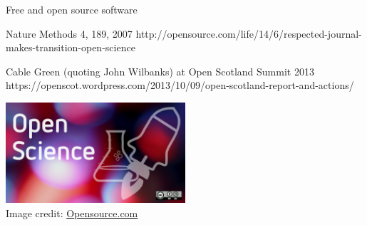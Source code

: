 \documentclass[xcolor={dvipsnames,usenames},beamer]{beamer}
\begin{document}
\begin{frame}{Free and open source software}

  {Nature Methods 4, 189, 2007}%
  {http://opensource.com/life/14/6/respected-journal-makes-transition-open-science}

%
  {Cable Green (quoting John Wilbanks) at Open Scotland Summit 2013}
  {https://openscot.wordpress.com/2013/10/09/open-scotland-report-and-actions/}

\bigskip
\bigskip

\centering
\includegraphics[width=0.5\textwidth]{./images/general/open_science}%
\\
\tiny
Image credit: \href{https://opensource.com/}{Opensource.com}


\end{frame}


\newcommand{\coursesTitle}{Courses at North Carolina State University}
\end{document}
